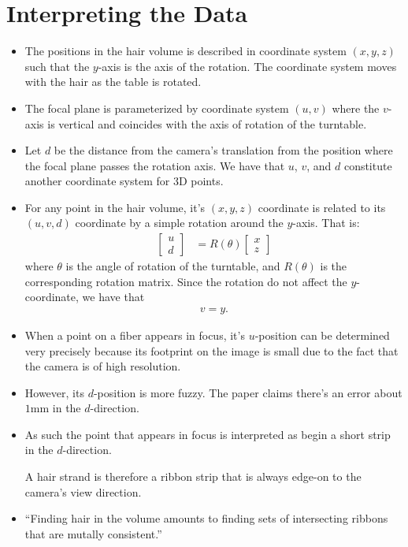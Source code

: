 \documentclass[10pt]{article}
\begin{document}
	\section{Interpreting the Data}
	\begin{itemize}
	  \item The positions in the hair volume is described in coordinate system $(x,y,z)$ such that the $y$-axis is the axis of the rotation. The coordinate system moves with the hair as the table is rotated.
	  
	  \item The focal plane is parameterized by coordinate system $(u,v)$ where the $v$-axis is vertical and coincides with the axis of rotation of the turntable.
	  
	  \item Let $d$ be the distance from the camera's translation from the position where the focal plane passes the rotation axis. We have that $u$, $v$, and $d$ constitute another coordinate system for 3D points.
	  
	  \item For any point in the hair volume, it's $(x,y,z)$ coordinate is related to its $(u,v,d)$ coordinate by a simple rotation around the $y$-axis. That is:
	  \begin{align*}
	    \begin{bmatrix}
	      u \\ d
	    \end{bmatrix}
	    &= R(\theta) \begin{bmatrix}
	     x \\ z
	    \end{bmatrix}
	  \end{align*}
	  where $\theta$ is the angle of rotation of the turntable, and $R(\theta)$ is the corresponding rotation matrix. Since the rotation do not affect the $y$-coordinate, we have that
	  \begin{align*}
	    v = y.
	  \end{align*}
	  
	  \item When a point on a fiber appears in focus, it's $u$-position can be determined very precisely because its footprint on the image is small due to the fact that the camera is of high resolution.
	  
	  \item However, its $d$-position is more fuzzy. The paper claims there's an error about $1\mathrm{mm}$ in the $d$-direction.
	  
	  \item As such the point that appears in focus is interpreted as begin a short strip in the $d$-direction.

	  A hair strand is therefore a ribbon strip that is always edge-on to the camera's view direction.
	  
	  \item ``Finding hair in the volume amounts to finding sets of intersecting ribbons that are mutally consistent.''
	\end{itemize}
\end{document}
